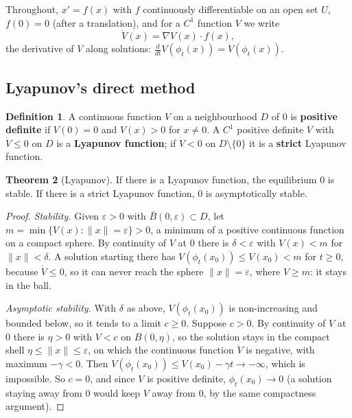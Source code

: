 \documentclass[11pt,a4paper]{article}
\numberwithin{equation}{section}
\theoremstyle{definition}
\newtheorem{thm}{Theorem}[subsection]
\newtheorem{defn}[thm]{Definition}
\begin{document}
Throughout, $x' = f(x)$ with $f$ continuously differentiable on an open set $U$, $f(0) = 0$ (after a translation), and for a $C^1$ function $V$ we write
\[
\dot V(x) = \nabla V(x)\cdot f(x) ,
\]
the derivative of $V$ along solutions: $\frac{d}{dt}V(\phi_t(x)) = \dot V(\phi_t(x))$.

\subsection{Lyapunov's direct method}
\label{ssec:direct}

\begin{defn}
A continuous function $V$ on a neighbourhood $D$ of $0$ is \textbf{positive definite} if $V(0) = 0$ and $V(x) > 0$ for $x \neq 0$. A $C^1$ positive definite $V$ with $\dot V \leq 0$ on $D$ is a \textbf{Lyapunov
function}; if $\dot V < 0$ on $D \setminus \{0\}$ it is a \textbf{strict} Lyapunov function.
\end{defn}

\begin{thm}[Lyapunov]
\label{thm:lyapunov}
If there is a Lyapunov function, the equilibrium $0$ is stable. If there is a strict Lyapunov function, $0$ is asymptotically stable.
\end{thm}

\begin{proof}
\emph{Stability.} Given $\varepsilon > 0$ with $\bar B(0, \varepsilon) \subset D$, let $m = \min\{V(x) : \|x\| = \varepsilon\} > 0$, a minimum of a positive continuous function on a compact sphere. By continuity of $V$ at $0$ there is $\delta < \varepsilon$
with $V(x) < m$ for $\|x\| < \delta$. A solution starting there has $V(\phi_t(x_0)) \leq V(x_0) < m$ for $t \geq 0$, because $\dot V \leq 0$, so it can never reach the sphere $\|x\| = \varepsilon$, where $V \geq m$: it stays in the ball.

\emph{Asymptotic stability.} With $\delta$ as above, $V(\phi_t(x_0))$ is non-increasing and bounded below, so it tends to a limit $c \geq 0$. Suppose $c > 0$. By continuity of $V$ at $0$ there is $\eta > 0$ with
$V < c$ on $B(0, \eta)$, so the solution stays in the compact shell $\eta \leq \|x\| \leq \varepsilon$, on which the continuous function $\dot V$ is negative, with maximum $-\gamma < 0$. Then $V(\phi_t(x_0)) \leq V(x_0) - \gamma t \to -\infty$,
which is impossible. So $c = 0$, and since $V$ is positive definite, $\phi_t(x_0) \to 0$ (a solution staying away from $0$ would keep $V$ away from $0$, by the same compactness argument).
\end{proof}
\end{document}
